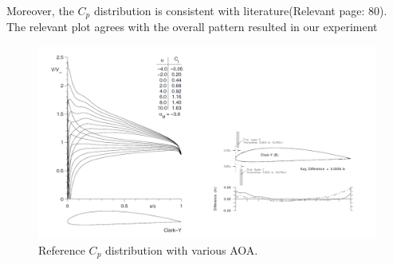\documentclass[runningheads]{llncs}
\begin{document}
\noindent
Moreover, the $C_p$ distribution is consistent with literature{\cite{lyon_broeren_giguere_gopalarathnam_selig_1997}}(Relevant page: 80). The relevant plot agrees with the overall pattern resulted in our experiment

\begin{figure}[H]
    \centering
    \includegraphics{figures/reference_cp.png}
    \caption{Reference $C_p$ distribution with various AOA.}
    \label{fig:lit_cp}
\end{figure}
\end{document}
